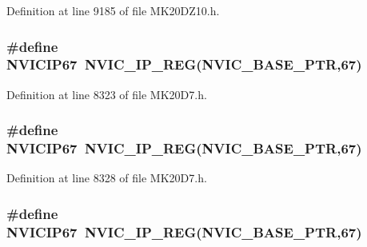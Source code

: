 Definition at line 9185 of file M\+K20\+D\+Z10.\+h.

\subsubsection[{\texorpdfstring{N\+V\+I\+C\+I\+P67}{NVICIP67}}]{\setlength{\rightskip}{0pt plus 5cm}\#define N\+V\+I\+C\+I\+P67~{\bf N\+V\+I\+C\+\_\+\+I\+P\+\_\+\+R\+EG}({\bf N\+V\+I\+C\+\_\+\+B\+A\+S\+E\+\_\+\+P\+TR},67)}\hypertarget{group___n_v_i_c___register___accessor___macros_ga2424f93ab46a5181530cbf9ac1d4e66f}{}\label{group___n_v_i_c___register___accessor___macros_ga2424f93ab46a5181530cbf9ac1d4e66f}


Definition at line 8323 of file M\+K20\+D7.\+h.

\subsubsection[{\texorpdfstring{N\+V\+I\+C\+I\+P67}{NVICIP67}}]{\setlength{\rightskip}{0pt plus 5cm}\#define N\+V\+I\+C\+I\+P67~{\bf N\+V\+I\+C\+\_\+\+I\+P\+\_\+\+R\+EG}({\bf N\+V\+I\+C\+\_\+\+B\+A\+S\+E\+\_\+\+P\+TR},67)}\hypertarget{group___n_v_i_c___register___accessor___macros_ga2424f93ab46a5181530cbf9ac1d4e66f}{}\label{group___n_v_i_c___register___accessor___macros_ga2424f93ab46a5181530cbf9ac1d4e66f}


Definition at line 8328 of file M\+K20\+D7.\+h.

\subsubsection[{\texorpdfstring{N\+V\+I\+C\+I\+P67}{NVICIP67}}]{\setlength{\rightskip}{0pt plus 5cm}\#define N\+V\+I\+C\+I\+P67~{\bf N\+V\+I\+C\+\_\+\+I\+P\+\_\+\+R\+EG}({\bf N\+V\+I\+C\+\_\+\+B\+A\+S\+E\+\_\+\+P\+TR},67)}\hypertarget{group___n_v_i_c___register___accessor___macros_ga2424f93ab46a5181530cbf9ac1d4e66f}{}\label{group___n_v_i_c___register___accessor___macros_ga2424f93ab46a5181530cbf9ac1d4e66f}


